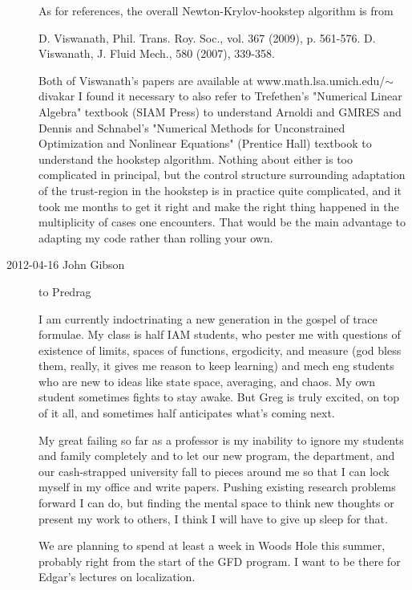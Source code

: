 \begin{description}
As for references, the overall Newton-Krylov-hookstep algorithm is from

D. Viswanath, Phil. Trans. Roy. Soc., vol. 367 (2009), p. 561-576.
D. Viswanath, J. Fluid Mech., 580 (2007), 339-358.

Both of Viswanath's papers are available at
{www.math.lsa.umich.edu/$\sim$divakar} I found it necessary to also
refer to Trefethen's "Numerical Linear Algebra" textbook (SIAM Press)
to understand Arnoldi and GMRES and Dennis and Schnabel's "Numerical
Methods for Unconstrained Optimization and Nonlinear Equations"
(Prentice Hall) textbook to understand the hookstep algorithm. Nothing
about either is too complicated in principal, but the control
structure surrounding adaptation of the trust-region in the hookstep
is in practice quite complicated, and it took me months to get it
right and make the right thing happened in the multiplicity of cases
one encounters. That would be the main advantage to adapting my code
rather than rolling your own.

\item[2012-04-16 John Gibson] to Predrag

I am currently indoctrinating a new generation in the gospel of trace
formulae. My class is half IAM students, who pester me with questions
of existence of limits, spaces of functions, ergodicity, and measure
(god bless them, really, it gives me reason to keep learning) and mech
eng students who are new to ideas like state space, averaging, and
chaos. My own student sometimes fights to stay awake. But Greg is
truly excited, on top of it all, and sometimes half anticipates what's
coming next.

My great failing so far as a professor is my inability to ignore my
students and family completely and to let our new program, the
department, and our cash-strapped university fall to pieces around me
so that I can lock myself in my office and write papers. Pushing
existing research problems forward I can do, but finding the mental
space to think new thoughts or present my work to others, I think I
will have to give up sleep for that.

We are planning to spend at least a week in Woods Hole this summer,
probably right from the start of the GFD program. I want to be there
for Edgar's lectures on localization.


\end{description}
